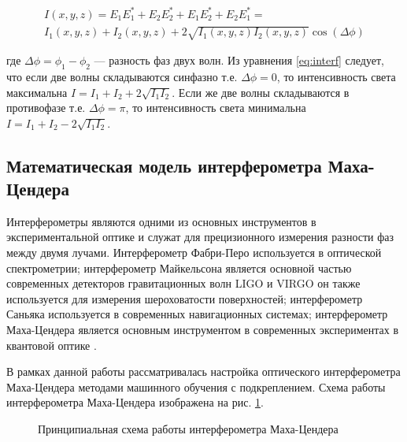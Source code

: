 \begin{multline}
    I(x, y, z) = E_1E_1^* + E_2E_2^* + E_1E_2^* + E_2E_1^* = \\
    I_1(x,y,z) + I_2(x,y,z) + 2 \sqrt{I_1(x,y,z)I_2(x,y,z)}\cos(\Delta \phi)
\label{eq:interf}
\end{multline}

где $\Delta \phi = \phi_1 - \phi_2$ --- разность фаз двух волн. Из уравнения \ref{eq:interf} следует, что если две волны складываются синфазно т.е. $\Delta \phi = 0$, то интенсивность света максимальна $I = I_1 + I_2 + 2\sqrt{I_1I_2}$. Если же две волны складываются в противофазе т.е. $\Delta \phi = \pi$, то интенсивность света минимальна $I = I_1 + I_2 - 2\sqrt{I_1I_2}$.

\subsection{Математическая модель интерферометра Маха-Цендера}

Интерферометры являются одними из основных инструментов в экспериментальной оптике и служат для прецизионного измерения разности фаз между двумя лучами. Интерферометр Фабри-Перо\cite{fabry-perot1899} используется в оптической спектрометрии; интерферометр Майкельсона является основной частью современных детекторов гравитационных волн LIGO и VIRGO \cite{LIGO, VIRGO} он также используется для измерения шероховатости поверхностей; интерферометр Саньяка используется в современных навигационных системах; интерферометр Маха-Цендера является основным инструментом в современных экспериментах в квантовой оптике \cite{Sarkar2006, Sychev2017}. 

В рамках данной работы рассматривалась настройка оптического интерферометра Маха-Цендера методами машинного обучения с подкреплением. Схема работы интерферометра Маха-Цендера изображена на рис. \ref{fig:MZI}. 

\begin{figure}[ht]
\caption{Принципиальная схема работы интерферометра Маха-Цендера}
\label{fig:MZI}
\end{figure}

